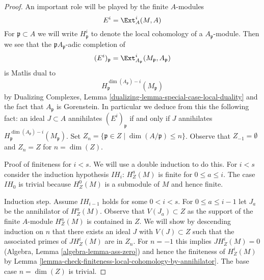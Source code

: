 \begin{proof}
An important role will be played by the finite $A$-modules
$$
E^i = \Ext_A^i(M, A)
$$
For $\mathfrak p \subset A$ we will write $H^i_\mathfrak p$ to denote the
local cohomology of a $A_\mathfrak p$-module. Then we see that
the $\mathfrak pA_\mathfrak p$-adic completion of
$$
(E^i)_\mathfrak p = \Ext^i_{A_\mathfrak p}(M_\mathfrak p, A_\mathfrak p)
$$
is Matlis dual to
$$
H^{\dim(A_\mathfrak p) - i}_{\mathfrak p}(M_\mathfrak p)
$$
by Dualizing Complexes, Lemma \ref{dualizing-lemma-special-case-local-duality}
and the fact that
$A_\mathfrak p$ is Gorenstein. In particular we deduce from this the
following fact: an ideal $J \subset A$ annihilates
$(E^i)_\mathfrak p$ if and only if $J$ annihilates
$H^{\dim(A_\mathfrak p) - i}_{\mathfrak p}(M_\mathfrak p)$.
Set $Z_n = \{\mathfrak p \in Z \mid \dim(A/\mathfrak p) \leq n\}$.
Observe that $Z_{-1} = \emptyset$ and $Z_n = Z$ for $n = \dim(Z)$.

\medskip\noindent
Proof of finiteness for $i < s$. We will use a double induction to
do this. For $i < s$ consider the induction hypothesis $IH_i$:
$H^a_Z(M)$ is finite for $0 \leq a \leq i$. The case $IH_0$ is trivial
because $H^0_Z(M)$ is a submodule of $M$ and hence finite.

\medskip\noindent
Induction step. Assume $IH_{i - 1}$ holds for some $0 < i < s$.
For $0 \leq a \leq i - 1$ let $J_a$ be the annihilator of
$H^a_Z(M)$. Observe that $V(J_a) \subset Z$ as the support
of the finite $A$-module $H^a_Z(M)$ is contained in $Z$.
We will show by descending induction on $n$ that there
exists an ideal $J$ with $V(J) \subset Z$ such that the
associated primes of $J H^i_Z(M)$ are in $Z_n$.
For $n = -1$ this implies $JH^i_Z(M) = 0$ 
(Algebra, Lemma \ref{algebra-lemma-ass-zero})
and hence the finiteness of $H^i_Z(M)$ by
Lemma \ref{lemma-check-finiteness-local-cohomology-by-annihilator}.
The base case $n = \dim(Z)$ is trivial.


\end{proof}

